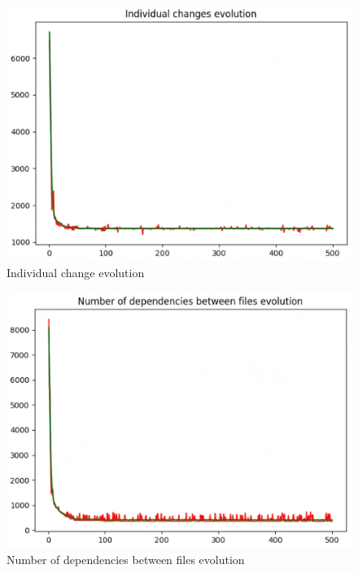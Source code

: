 \documentclass[sigconf]{acmart}
\begin{document}
%

\begin{figure}[h]
  \centering
  \includegraphics[width=\linewidth]{img_11}
  \caption{Individual change evolution}
  \Description{}
\end{figure}

\begin{figure}[h]
  \centering
  \includegraphics[width=\linewidth]{img_12}
  \caption{Number of dependencies between files evolution}
  \Description{}
\end{figure}
\end{document}
